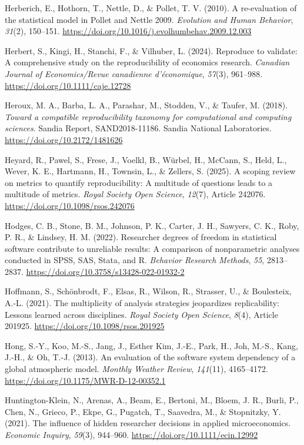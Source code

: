 \documentclass[authordate, meta]{jote-new-article}
\begin{document}
	Herberich, E., Hothorn, T., Nettle, D., \& Pollet, T. V. (2010). A re-evaluation of the statistical model in Pollet and Nettle 2009. \emph{Evolution and Human Behavior}, \emph{31}(2), 150--151. \url{https://doi.org/10.1016/j.evolhumbehav.2009.12.003}


	Herbert, S., Kingi, H., Stanchi, F., \& Vilhuber, L. (2024). Reproduce to validate: A comprehensive study on the reproducibility of economics research. \emph{Canadian Journal of Economics/Revue canadienne d'économique}, \emph{57}(3), 961--988. \url{https://doi.org/10.1111/caje.12728}

	Heroux, M. A., Barba, L. A., Parashar, M., Stodden, V., \& Taufer, M. (2018). \emph{Toward a compatible reproducibility taxonomy for computational and computing sciences}. Sandia Report, SAND2018-11186. Sandia National Laboratories. \url{https://doi.org/10.2172/1481626}


	Heyard, R., Pawel, S., Frese, J., Voelkl, B., Würbel, H., McCann, S., Held, L., Wever, K. E., Hartmann, H., Townsin, L., \& Zellers, S. (2025). A scoping review on metrics to quantify reproducibility: A multitude of questions leads to a multitude of metrics. \emph{Royal Society Open Science}, \emph{12}(7), Article 242076. \url{https://doi.org/10.1098/rsos.242076}


	Hodges, C. B., Stone, B. M., Johnson, P. K., Carter, J. H., Sawyers, C. K., Roby, P. R., \& Lindsey, H. M. (2022). Researcher degrees of freedom in statistical software contribute to unreliable results: A comparison of nonparametric analyses conducted in SPSS, SAS, Stata, and R. \emph{Behavior Research Methods}, \emph{55}, 2813--2837. \url{https://doi.org/10.3758/s13428-022-01932-2}


	Hoffmann, S., Schönbrodt, F., Elsas, R., Wilson, R., Strasser, U., \& Boulesteix, A.-L. (2021). The multiplicity of analysis strategies jeopardizes replicability: Lessons learned across disciplines. \emph{Royal Society Open Science}, \emph{8}(4), Article 201925. \url{https://doi.org/10.1098/rsos.201925}


	Hong, S.-Y., Koo, M.-S., Jang, J., Esther Kim, J.-E., Park, H., Joh, M.-S., Kang, J.-H., \& Oh, T.-J. (2013). An evaluation of the software system dependency of a global atmospheric model. \emph{Monthly Weather Review}, \emph{141}(11), 4165--4172. \url{https://doi.org/10.1175/MWR-D-12-00352.1}


	Huntington-Klein, N., Arenas, A., Beam, E., Bertoni, M., Bloem, J. R., Burli, P., Chen, N., Grieco, P., Ekpe, G., Pugatch, T., Saavedra, M., \& Stopnitzky, Y. (2021). The influence of hidden researcher decisions in applied microeconomics. \emph{Economic Inquiry}, \emph{59}(3), 944--960. \url{https://doi.org/10.1111/ecin.12992}
\end{document}
